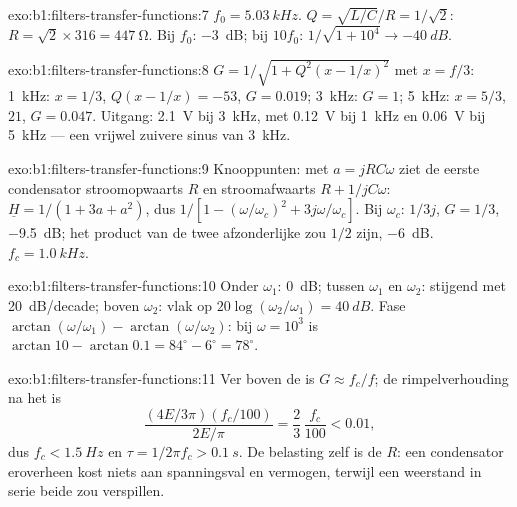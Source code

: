 \begin{solution}{exo:b1:filters-transfer-functions:7}
$f_0 = \qty{5.03}{kHz}$. $Q = \sqrt{L/C}/R = 1/\sqrt2$: $R = \sqrt2 \times
316 = \qty{447}{\ohm}$. Bij $f_0$: \qty{-3}{dB}; bij $10f_0$: $1/\sqrt{1 +
10^4} \to \qty{-40}{dB}$.
\end{solution}

\begin{solution}{exo:b1:filters-transfer-functions:8}
$G = 1/\sqrt{1 + Q^2(x - 1/x)^2}$ met $x = f/3$: \qty{1}{kHz}: $x = 1/3$,
$Q(x - 1/x) = -53$, $G = 0.019$; \qty{3}{kHz}: $G = 1$; \qty{5}{kHz}:
$x = 5/3$, $21$, $G = 0.047$. Uitgang: \qty{2.1}{V} bij \qty{3}{kHz}, met
\qty{0.12}{V} bij \qty{1}{kHz} en \qty{0.06}{V} bij \qty{5}{kHz} --- een
vrijwel zuivere sinus van \qty{3}{kHz}.
\end{solution}

\begin{solution}{exo:b1:filters-transfer-functions:9}
Knooppunten: met $a = jRC\omega$ ziet de eerste condensator stroomopwaarts $R$ en
stroomafwaarts $R + 1/jC\omega$: $\underline H = 1/(1 + 3a + a^2)$, dus
$1/[1 - (\omega/\omega_c)^2 + 3j\omega/\omega_c]$. Bij $\omega_c$: $1/3j$,
$G = 1/3$, \qty{-9.5}{dB}; het product van de twee afzonderlijke  zou
$1/2$ zijn, \qty{-6}{dB}. $f_c = \qty{1.0}{kHz}$.
\end{solution}

\begin{solution}{exo:b1:filters-transfer-functions:10}
Onder $\omega_1$: \qty{0}{dB}; tussen $\omega_1$ en $\omega_2$: stijgend met
\qty{20}{dB/decade}; boven $\omega_2$: vlak op $20\log(\omega_2/\omega_1) =
\qty{40}{dB}$. Fase $\arctan(\omega/\omega_1) - \arctan(\omega/\omega_2)$:
bij $\omega = 10^3$ is $\arctan 10 - \arctan 0.1 = 84^\circ - 6^\circ =
78^\circ$.
\end{solution}

\begin{solution}{exo:b1:filters-transfer-functions:11}
Ver boven de  is $G \approx f_c/f$; de rimpelverhouding na
het  is
\[
\frac{(4E/3\pi)(f_c/100)}{2E/\pi} = \frac{2}{3}\,\frac{f_c}{100} < 0.01,
\]
dus $f_c < \qty{1.5}{Hz}$ en $\tau = 1/2\pi f_c > \qty{0.1}{s}$. De belasting zelf is de
$R$: een condensator eroverheen kost niets aan spanningsval en vermogen,
terwijl een weerstand in serie beide zou verspillen.
\end{solution}


